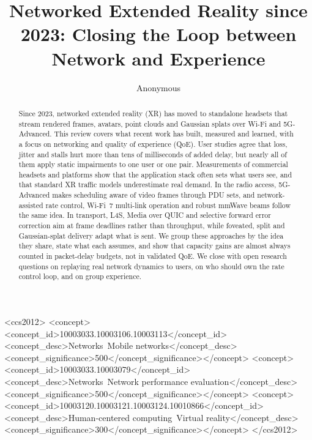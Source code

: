 \documentclass[acmsmall,screen]{acmart}
\begin{document}
\title{Networked Extended Reality since 2023: Closing the Loop between Network and Experience}

\author{Anonymous}

\begin{abstract}
Since 2023, networked extended reality (XR) has moved to standalone headsets that stream rendered frames,
avatars, point clouds and Gaussian splats over Wi-Fi and 5G-Advanced. This review covers what recent work
has built, measured and learned, with a focus on networking and quality of experience (QoE). User studies
agree that loss, jitter and stalls hurt more than tens of milliseconds of added delay, but nearly all of
them apply static impairments to one user or one pair. Measurements of commercial headsets and platforms
show that the application stack often sets what users see, and that standard XR traffic models
underestimate real demand. In the radio access, 5G-Advanced makes scheduling aware of video frames through
PDU sets, and network-assisted rate control, Wi-Fi~7 multi-link operation and robust mmWave beams follow
the same idea. In transport, L4S, Media over QUIC and selective forward error correction aim at frame
deadlines rather than throughput, while foveated, split and Gaussian-splat delivery adapt what is sent. We
group these approaches by the idea they share, state what each assumes, and show that capacity gains are
almost always counted in packet-delay budgets, not in validated QoE. We close with open research questions
on replaying real network dynamics to users, on who should own the rate control loop, and on group
experience.
\end{abstract}

\begin{CCSXML}
<ccs2012>
<concept><concept_id>10003033.10003106.10003113</concept_id><concept_desc>Networks~Mobile networks</concept_desc><concept_significance>500</concept_significance></concept>
<concept><concept_id>10003033.10003079</concept_id><concept_desc>Networks~Network performance evaluation</concept_desc><concept_significance>500</concept_significance></concept>
<concept><concept_id>10003120.10003121.10003124.10010866</concept_id><concept_desc>Human-centered computing~Virtual reality</concept_desc><concept_significance>300</concept_significance></concept>
</ccs2012>
\end{CCSXML}
\end{document}

